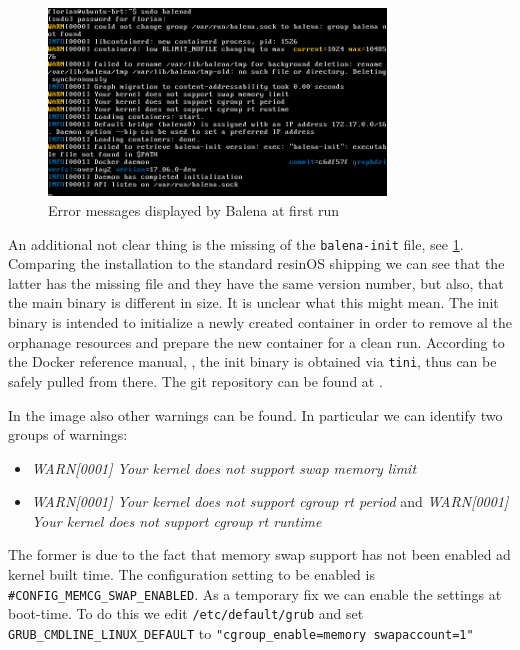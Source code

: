 \documentclass[]{scrartcl}
\begin{document}
\begin{figure}[t]
	\centering
	\includegraphics[width=0.8\textwidth]{balena-err}
	\caption{Error messages displayed by Balena at first run}
	\label{fig:balenad}
\end{figure}

An additional not clear thing is the missing of the \texttt{balena-init} file, see \ref{fig:balenad}. Comparing the installation to the standard resinOS shipping we can see that the latter has the missing file and they have the same version number, but also, that the main binary is different in size. It is unclear what this might mean. The init binary is intended to initialize a newly created container in order to remove al the orphanage resources and prepare the new container for a clean run. According to the Docker reference manual, \cite{docker03}, the init binary is obtained via \texttt{tini}, thus can be safely pulled from there. The git repository can be found at \cite{tini01}.

In the image also other warnings can be found. In particular we can identify two groups of warnings:

\begin{itemize}
	\item \textit{WARN[0001] Your kernel does not support swap memory limit}

	\item \textit{WARN[0001] Your kernel does not support cgroup rt period} and \textit{WARN[0001] Your kernel does not support cgroup rt runtime} 
\end{itemize}

The former is due to the fact that memory swap support has not been enabled ad kernel built time. 
The configuration setting to be enabled is \texttt{\#CONFIG\_MEMCG\_SWAP\_ENABLED}. As a temporary fix we can enable the settings at boot-time. 
To do this we edit \texttt{/etc/default/grub} and set 
\texttt{GRUB\_CMDLINE\_LINUX\_DEFAULT} to \texttt{"cgroup\_enable=memory swapaccount=1"}
\end{document}
